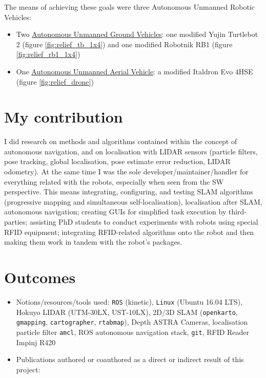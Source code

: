 The means of achieving these goals were three Autonomous Unmanned Robotic Vehicles:

\begin{itemize}
  \item Two
        \href{https://www.youtube.com/watch?v=bo4lMI640DY}{Autonomous Unmanned Ground Vehicles}:
        one modified Yujin Turtlebot 2 (figure \ref{fig:relief_tb_1x4}) and one
        modified Robotnik RB1 (figure \ref{fig:relief_rb1_1x4})
  \item One
        \href{https://www.youtube.com/watch?v=9YpBIaO4tgY}{Autonomous Unmanned Aerial Vehicle}:
        a modified Italdron Evo 4HSE (figure \ref{fig:relief_drone})
\end{itemize}

\section{My contribution}
I did research on methods and algorithms contained within the concept of
autonomous navigation, and on localisation with LIDAR sensors (particle
filters, pose tracking, global localisation, pose estimate error reduction,
LIDAR odometry). At the same time I was the sole developer/maintainer/handler
for everything related with the robots, especially when seen from the SW
perspective. This means integrating, configuring, and testing SLAM algorithms
(progressive mapping and simultaneous self-localisation), localisation after
SLAM, autonomous navigation; creating GUIs for simplified task execution by
third-parties; assisting PhD students to conduct experiments with robots
using special RFID equipment; integrating RFID-related algorithms onto the
robot and then making them work in tandem with the robot's packages.

\section{Outcomes}

\begin{itemize}
  \item Notions/resources/tools used: \texttt{ROS} (kinetic), \texttt{Linux} (Ubuntu 16.04 LTS), Hokuyo LIDAR (UTM-30LX, UST-10LX), 2D/3D SLAM (\texttt{openkarto}, \texttt{gmapping}, \texttt{cartographer}, \texttt{rtabmap}), Depth ASTRA Cameras, localisation particle filter \texttt{amcl}, ROS autonomous navigation stack, \texttt{git}, RFID Reader Impinj R420
  \item Publications authored or coauthored as a direct or indirect result of this project: \cite{9617436,Filotheou2022a,FILOTHEOU2023100288,10160120,9981228}
\end{itemize}

